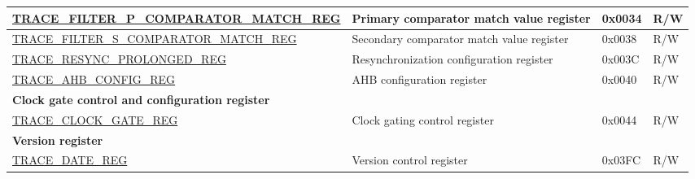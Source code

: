 \begin{longtable}{ | p{7.2cm} | p{6cm} | p{1.3cm} | p{1cm} | }
\hyperref[regdesc:TRACEFILTERPCOMPARATORMATCHREG]{TRACE\_FILTER\_P\_COMPARATOR\_MATCH\_REG} & Primary comparator match value register & 0x0034 & R/W \\ \hline
\hyperref[regdesc:TRACEFILTERSCOMPARATORMATCHREG]{TRACE\_FILTER\_S\_COMPARATOR\_MATCH\_REG} & Secondary comparator match value register & 0x0038 & R/W \\ \hline
\hyperref[regdesc:TRACERESYNCPROLONGEDREG]{TRACE\_RESYNC\_PROLONGED\_REG} & Resynchronization configuration register & 0x003C & R/W \\ \hline
\hyperref[regdesc:TRACEAHBCONFIGREG]{TRACE\_AHB\_CONFIG\_REG} & AHB configuration register & 0x0040 & R/W \\ \hline
\multicolumn{4}{|l|}{\textbf{Clock gate control and configuration register}} \\ \hline
\hyperref[regdesc:TRACECLOCKGATEREG]{TRACE\_CLOCK\_GATE\_REG} & Clock gating control register & 0x0044 & R/W \\ \hline
\multicolumn{4}{|l|}{\textbf{Version register}} \\ \hline
\hyperref[regdesc:TRACEDATEREG]{TRACE\_DATE\_REG} & Version control register & 0x03FC & R/W \\ \hline
\end{longtable}
